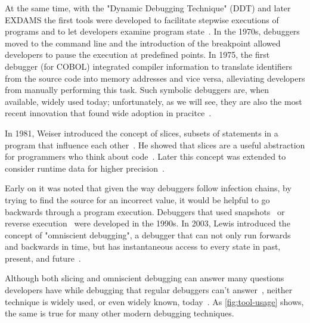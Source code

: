 At the same time, with the "Dynamic Debugging Technique" (DDT) and later EXDAMS the first tools were developed to facilitate stepwise executions of programs and to let developers examine program state~\cite{balzer69:exdams_extendable_debugging}.
In the 1970s, debuggers moved to the command line and the introduction of the breakpoint allowed developers to pause the execution at predefined points.
In 1975, the first debugger (for COBOL) integrated compiler information to translate identifiers from the source code into memory addresses and vice versa, alleviating developers from manually performing this task.
Such symbolic debuggers are, when available, widely used today; unfortunately, as we will see, they are also the most recent innovation that found wide adoption in pracitce~\cite{perscheid17:studying_the_advancement}.

In 1981, Weiser introduced the concept of slices, subsets of statements in a program that influence each other~\cite{weiser81:program_slicing}. 
He showed that slices are a useful abstraction for programmers who think about code~\cite{weiser82:programmers_use_slices_when}.
Later this concept was extended to consider runtime data for higher precision~\cite{agrawal90:dynamic_program_slicing, korel90:dynamic_slicing_of_computer}.

Early on it was noted that given the way debuggers follow infection chains, by trying to find the source for an incorrect value, it would be helpful to go backwards through a program execution.
Debuggers that used snapshots~\cite{feldman88:igor_a_system} or reverse execution~\cite{lieberman95:zstep_95_a_reversible} were developed in the 1990s.
In 2003, Lewis introduced the concept of "omniscient debugging", a debugger that can not only run forwards and backwards in time, but has instantaneous access to every state in past, present, and future~\cite{lewis03:debugging_backwards_in_time}.

Although both slicing and omniscient debugging can answer many questions developers have while debugging that regular debuggers can't answer~\cite{ko07:information_needs_in_collocated, storey97:how_do_program_understanding, sillito06:questions_programmers_ask}, neither technique is widely used, or even widely known, today~\cite{perscheid17:studying_the_advancement}.
As \cref{fig:tool-usage} shows, the same is true for many other modern debugging techniques.

